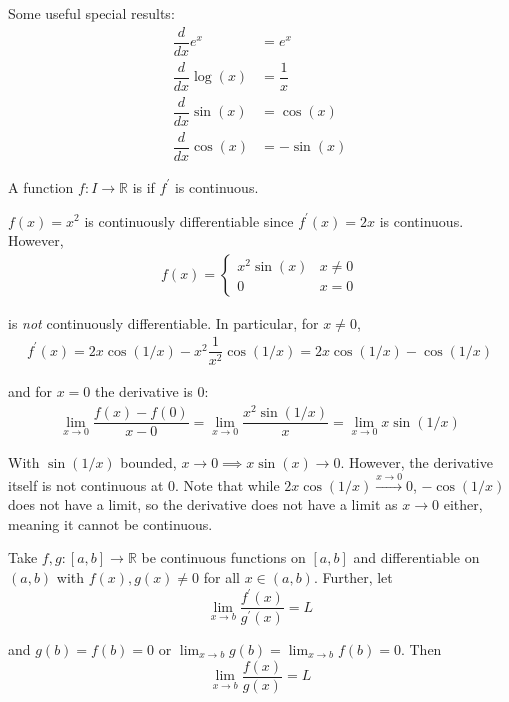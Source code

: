 \documentclass{article}
\begin{document}
Some useful special results:
\begin{align*}
  \dfrac{d}{dx} e^x & = e^x  \\
  \dfrac{d}{dx} \log(x) & = \dfrac{1}{x} \\
  \dfrac{d}{dx} \sin(x) & = \cos(x) \\
  \dfrac{d}{dx} \cos(x) & = -\sin(x)
\end{align*}

\begin{definition}
  A function $f: I \to \mathbb{R}$ is  if $f^\prime$ is continuous.
\end{definition}

\begin{example}
  $f(x) = x^2$ is continuously differentiable since $f^\prime(x) = 2x$ is continuous. However,
  \begin{align*}
    f(x) = \begin{cases}
      x^2 \sin(x) & x \ne 0 \\
      0 & x = 0
    \end{cases}
  \end{align*}

  is \textit{not} continuously differentiable. In particular, for $x \ne 0$,
  \begin{align*}
    f^\prime(x)
    =
    2 x \cos(1/x) - x^2 \dfrac{1}{x^2} \cos(1/x)
    =
    2 x \cos(1/x) - \cos(1/x)
  \end{align*}

  and for $x = 0$ the derivative is $0$:
  \begin{align*}
    \lim_{x \to 0}
    \dfrac{f(x) - f(0)}{x - 0}
    =
    \lim_{x \to 0}
    \dfrac{x^2 \sin(1/x)}{x}
    =
    \lim_{x \to 0}
    x \sin(1/x)
  \end{align*}

  With $\sin(1/x)$ bounded, $x \to 0 \implies x \sin(x) \to 0$. However, the derivative itself is not continuous  at $0$. Note that while $2x \cos(1/x) \xrightarrow{x \to 0} 0$, $- \cos(1/x)$ does not have a limit, so the derivative does not have a limit as $x \to 0$ either, meaning it cannot be continuous.
\end{example}

\begin{theorem}\label{thm:lecture4_lhopital}
  Take $f, g: [a, b] \to \mathbb{R}$ be continuous functions on $[a, b]$ and differentiable on $(a, b)$ with $f(x), g(x) \ne 0$ for all $x \in (a, b)$. Further, let
  \[
    \lim_{x \to b} \dfrac{f^\prime(x)}{g^\prime(x)} = L
  \]

  and $g(b) = f(b) = 0$ or $\lim_{x \to b} g(b) = \lim_{x \to b} f(b) = 0$. Then
  \[
    \lim_{x \to b} \dfrac{f(x)}{g(x)} = L
  \]
\end{theorem}
\end{document}
